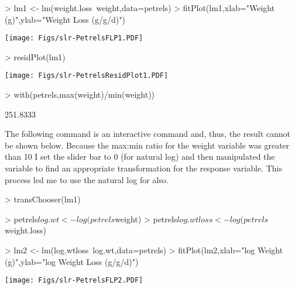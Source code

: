 \documentclass[a4paper]{article}
\begin{document}
\begin{Schunk}
\begin{Sinput}
> lm1 <- lm(weight.loss~weight,data=petrels)
> fitPlot(lm1,xlab="Weight (g)",ylab="Weight Loss (g/g/d)")
\end{Sinput}
\end{Schunk}
\vspace{-12pt}
\texttt{[image: Figs/slr-PetrelsFLP1.PDF]}

\begin{Schunk}
\begin{Sinput}
> residPlot(lm1)
\end{Sinput}
\end{Schunk}
\vspace{-12pt}
\texttt{[image: Figs/slr-PetrelsResidPlot1.PDF]}

\begin{Schunk}
\begin{Sinput}
> with(petrels,max(weight)/min(weight))
\end{Sinput}
\begin{Soutput}
[1] 251.8333
\end{Soutput}
\end{Schunk}

The following command is an interactive command and, thus, the result cannot be shown below.  Because the max:min ratio for the weight variable was greater than 10 I set the  slider bar to 0 (for natural log) and then manipulated the  variable to find an appropriate transformation for the response variable.  This process led me to use the natural log for  also.

\begin{Schunk}
\begin{Sinput}
> transChooser(lm1)
\end{Sinput}
\end{Schunk}

\vspace{-18pt}
\begin{Schunk}
\begin{Sinput}
> petrels$log.wt <- log(petrels$weight)
> petrels$log.wtloss <- log(petrels$weight.loss)
\end{Sinput}
\end{Schunk}
\vspace{-18pt}
\begin{Schunk}
\begin{Sinput}
> lm2 <- lm(log.wtloss~log.wt,data=petrels)
> fitPlot(lm2,xlab="log Weight (g)",ylab="log Weight Loss (g/g/d)")
\end{Sinput}
\end{Schunk}
\vspace{-12pt}
\texttt{[image: Figs/slr-PetrelsFLP2.PDF]}
\end{document}
